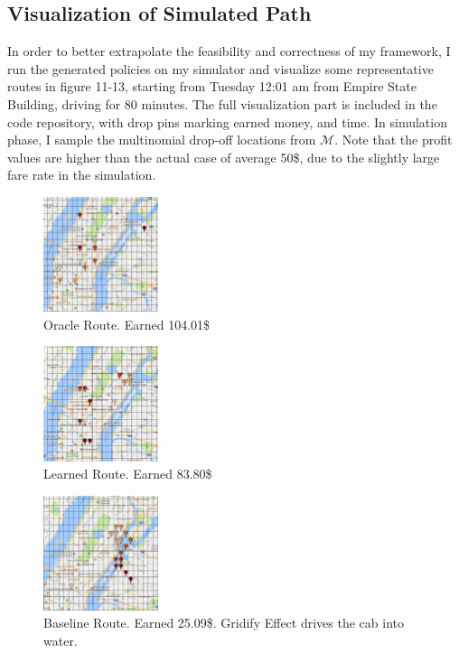 \documentclass[letterpaper, 10 pt, conference]{ieeeconf}
\begin{document}
\subsection{Visualization of Simulated Path}
In order to better extrapolate the feasibility and correctness of my framework, I run the generated policies on my simulator and visualize some representative routes in figure 11-13, starting from Tuesday 12:01 am from Empire State Building, driving for 80 minutes. The full visualization part is included in the code repository, with drop pins marking earned money, and time. In simulation phase, I sample the multinomial drop-off locations from $\mathcal{M}$. Note that the profit values are higher than the actual case of average 50\$, due to the slightly large fare rate in the simulation.
\begin{figure}
\centering
\includegraphics[width=0.3\textwidth]{oracle.png}
\caption{Oracle Route. Earned 104.01\$}
\end{figure}
\begin{figure}
\centering
\includegraphics[width=0.3\textwidth]{learned.png}
\caption{Learned Route. Earned 83.80\$}
\end{figure}
\begin{figure}
\centering
\includegraphics[width=0.3\textwidth]{baseline.png}
\caption{Baseline Route. Earned 25.09\$. Gridify Effect drives the cab into water.}
\end{figure}
\end{document}
